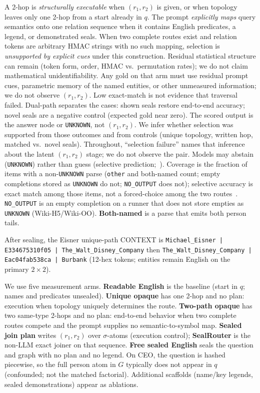 \documentclass[10pt]{article} %
\begin{document}
A 2-hop is \emph{structurally executable} when $(r_1,r_2)$ is given, or when
topology leaves only one 2-hop from a start already in $q$. The prompt
\emph{explicitly maps} query semantics onto one relation sequence when it
contains English predicates, a legend, or demonstrated seals.
When two complete routes exist and relation tokens are arbitrary HMAC strings
with no such mapping, selection is \emph{unsupported by explicit cues}
under this construction.
Residual statistical structure can remain (token form, order, HMAC vs.\
permutation rates); we do not claim mathematical unidentifiability.
Any gold on that arm must use residual prompt cues, parametric memory of
the named entities, or other unmeasured information; we do not observe
$(r_1,r_2)$.
Low exact-match is not evidence that traversal failed.
Dual-path separates the cases: shown seals restore end-to-end accuracy;
novel seals are a negative control (expected gold near zero).
The scored output is the answer node or \texttt{UNKNOWN}, not $(r_1,r_2)$.
We infer whether selection was supported from those outcomes and from
controls (unique topology, written hop, matched vs.\ novel seals).
Throughout, ``selection failure'' names that inference about the latent
$(r_1,r_2)$ stage; we do not observe the pair.
Models may abstain (\texttt{UNKNOWN}) rather than guess
(selective prediction;~\citealp{elyaniv2010selective,geifman2017selective}).
Coverage is the fraction of items with a non-\texttt{UNKNOWN} parse
(\texttt{other} and both-named count; empty completions stored as
\texttt{UNKNOWN} do not; \texttt{NO\_OUTPUT} does not);
selective accuracy is exact match among those items, not a forced-choice
among the two routes~\citep{elyaniv2010selective,wen2025abstention}.
\texttt{NO\_OUTPUT} is an empty completion on a runner that does not store
empties as \texttt{UNKNOWN} (Wiki-H5/Wiki-OO).
\textbf{Both-named} is a parse that emits both person tails.

After sealing, the Eisner unique-path CONTEXT is
\texttt{Michael\_Eisner | E334675310f05 | The\_Walt\_Disney\_Company} then
\texttt{The\_Walt\_Disney\_Company | Eac04fab538ca | Burbank}
(12-hex tokens; entities remain English on the primary $2{\times}2$).

We use five measurement arms.
\textbf{Readable English} is the baseline (start in $q$; names and
predicates unsealed).
\textbf{Unique opaque} has one 2-hop and no plan: execution when topology
uniquely determines the route.
\textbf{Two-path opaque} has two same-type 2-hops and no plan: end-to-end
behavior when two complete routes compete and the prompt supplies no
semantic-to-symbol map.
\textbf{Sealed join plan} writes $(r_1,r_2)$ over $\sigma$-atoms (execution
control); \textbf{SealRouter} is the non-LLM exact joiner on that sequence.
\textbf{Free sealed English} seals the question and graph with no plan and
no legend. On CEO, the question is hashed piecewise, so the full person atom
in $G$ typically does not appear in $q$ (confounded; not the matched
factorial).
Additional scaffolds (name/key legends, sealed demonstrations) appear as
ablations.
\end{document}
